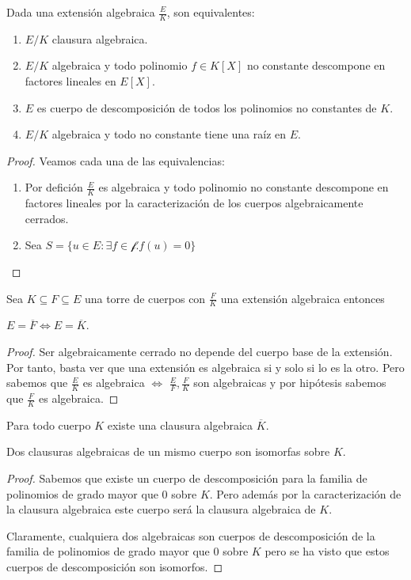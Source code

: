 \begin{proposition}
Dada una extensión algebraica $\frac{E}{K}$, son equivalentes:

\begin{enumerate}
\item $E/K$ clausura algebraica.
\item $E/K$ algebraica y todo polinomio $f \in K[X]$ no constante  descompone en factores lineales en $E[X]$.
\item $E$ es cuerpo de descomposición de todos los polinomios no constantes de $K$.
\item $E/K$ algebraica y todo no constante tiene una raíz en $E$.
\end{enumerate}
\end{proposition}
\begin{proof}
Veamos cada una de las equivalencias:

\begin{enumerate}
\item Por defición $\frac{E}{K}$ es algebraica y todo polinomio no constante descompone en factores lineales por la caracterización de los cuerpos algebraicamente cerrados. 
\item Sea $S = \{u \in E:\exists f \in \mathcal{f}. f(u) = 0\}$
\end{enumerate}
\end{proof}

\begin{proposition}
Sea $K \subseteq F \subseteq E$ una torre de cuerpos con $\frac{F}{K}$ una extensión algebraica entonces 

$E = \overline{F} \iff E = \overline{K}$. 
\end{proposition}
\begin{proof}
Ser algebraicamente cerrado no depende del cuerpo base de la extensión. Por tanto, basta ver que una extensión es algebraica si y solo si lo es la otro. Pero sabemos que $\frac{E}{K}$ es algebraica $\iff$ $\frac{E}{F},\frac{F}{K}$ son algebraicas y por hipótesis sabemos que $\frac{F}{K}$ es algebraica. 
\end{proof}

\begin{theorem}
	Para todo cuerpo $K$ existe una clausura algebraica $\overline{K}$. 
	
	Dos clausuras algebraicas de un mismo cuerpo son isomorfas sobre $K$. 
\end{theorem}
\begin{proof}
Sabemos que existe un cuerpo de descomposición para la familia de polinomios de grado mayor que 0 sobre $K$. Pero además por la caracterización de la clausura algebraica este cuerpo será la clausura algebraica de $K$.

Claramente, cualquiera dos algebraicas son cuerpos de descomposición de la familia de polinomios de grado mayor que 0 sobre $K$ pero se ha visto que estos cuerpos de descomposición son isomorfos. 
\end{proof}

